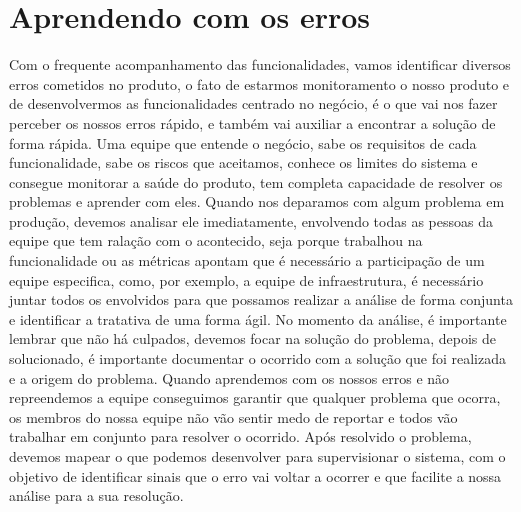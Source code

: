     \section{Aprendendo com os erros}
      Com o frequente acompanhamento das funcionalidades, vamos identificar
      diversos erros cometidos no produto, o fato de estarmos monitoramento o nosso
      produto e de desenvolvermos as funcionalidades centrado no negócio, é o que
      vai nos fazer perceber os nossos erros rápido, e também vai auxiliar
      a encontrar a solução de forma rápida. Uma equipe que entende o negócio,
      sabe os requisitos de cada funcionalidade, sabe os riscos que aceitamos,
      conhece os limites do sistema e consegue monitorar a saúde do produto, tem
      completa capacidade de resolver os problemas e aprender com eles. \newline
      Quando nos deparamos com algum problema em produção, devemos analisar ele
      imediatamente, envolvendo todas as pessoas da equipe que tem ralação com o
      acontecido, seja porque trabalhou na funcionalidade ou as métricas apontam
      que é necessário a participação de um equipe especifica, como, por exemplo, a
      equipe de infraestrutura, é necessário juntar todos os envolvidos para que
      possamos realizar a análise de forma conjunta e identificar a tratativa de
      uma forma ágil. No momento da análise, é importante lembrar que não há
      culpados, devemos focar na solução do problema, depois de solucionado, é
      importante documentar o ocorrido com a solução que foi realizada e a origem
      do problema. Quando aprendemos com os nossos erros e não repreendemos a
      equipe conseguimos garantir que qualquer problema que ocorra, os membros do
      nossa equipe não vão sentir medo de reportar e todos vão trabalhar em conjunto
      para resolver o ocorrido. Após resolvido o problema, devemos mapear o que
      podemos desenvolver para supervisionar o sistema, com o objetivo de identificar
      sinais que o erro vai voltar a ocorrer e que facilite a nossa análise para
      a sua resolução. \newline

